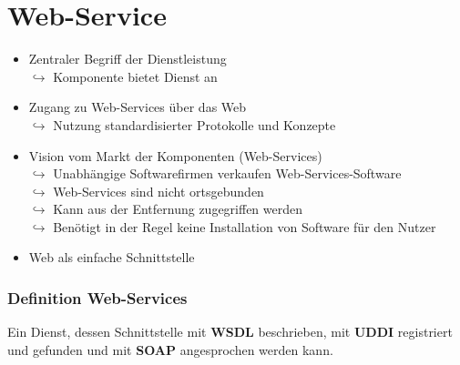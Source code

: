 \documentclass[a4paper,10pt]{scrreprt}
\begin{document}
	\section{Web-Service}
	\begin{itemize}
		\item Zentraler Begriff der Dienstleistung\\[5pt]
		$\hookrightarrow$ Komponente bietet Dienst an
		\item Zugang zu Web-Services über das Web\\[5pt]
		$\hookrightarrow$ Nutzung standardisierter Protokolle und Konzepte
	\end{itemize}
	\begin{itemize}
		\item Vision vom Markt der Komponenten (Web-Services)\\[5pt]
		$\hookrightarrow$ Unabhängige Softwarefirmen verkaufen Web-Services-Software\\[5pt]
		$\hookrightarrow$ Web-Services sind nicht ortsgebunden\\[5pt]
		\hspace*{20pt}$\hookrightarrow$ Kann aus der Entfernung zugegriffen werden\\[5pt]
		\hspace*{20pt}$\hookrightarrow$ Benötigt in der Regel keine Installation von Software für den Nutzer
		\item Web als einfache Schnittstelle
	\end{itemize}
	\subsubsection{Definition Web-Services}
	Ein Dienst, dessen Schnittstelle mit \textbf{WSDL} beschrieben, mit \textbf{UDDI} registriert und gefunden und mit \textbf{SOAP} angesprochen werden kann.
\end{document}
